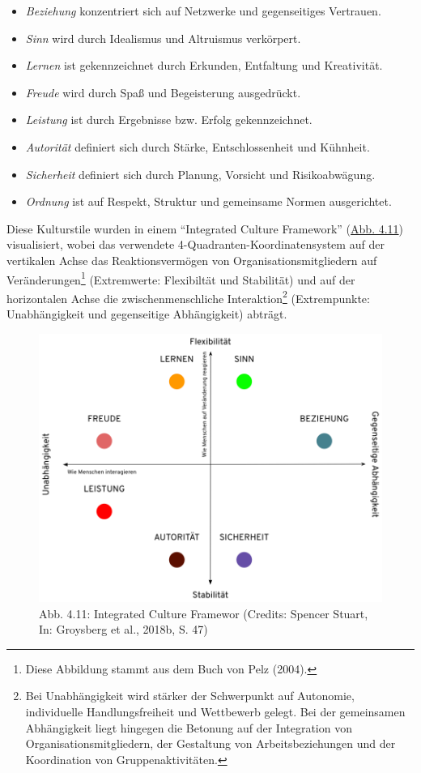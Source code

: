 \documentclass[
  letterpaper,
]{book}
\begin{document}
\begin{itemize}
\item
  \emph{Beziehung} konzentriert sich auf Netzwerke und gegenseitiges
  Vertrauen.
\item
  \emph{Sinn} wird durch Idealismus und Altruismus verkörpert.
\item
  \emph{Lernen} ist gekennzeichnet durch Erkunden, Entfaltung und
  Kreativität.
\item
  \emph{Freude} wird durch Spaß und Begeisterung ausgedrückt.
\item
  \emph{Leistung} ist durch Ergebnisse bzw. Erfolg gekennzeichnet.
\item
  \emph{Autorität} definiert sich durch Stärke, Entschlossenheit und
  Kühnheit.
\item
  \emph{Sicherheit} definiert sich durch Planung, Vorsicht und
  Risikoabwägung.
\item
  \emph{Ordnung} ist auf Respekt, Struktur und gemeinsame Normen
  ausgerichtet.
\end{itemize}

Diese Kulturstile wurden in einem ``Integrated Culture Framework''
(\hyperref[figure411]{Abb. 4.11}) visualisiert, wobei das verwendete
4-Quadranten-Koordinatensystem auf der vertikalen Achse das
Reaktionsvermögen von Organisationsmitgliedern auf
Veränderungen\footnote{Diese Abbildung stammt aus dem Buch von Pelz
  (2004).} (Extremwerte: Flexibiltät und Stabilität) und auf der
horizontalen Achse die zwischenmenschliche Interaktion\footnote{Bei
  Unabhängigkeit wird stärker der Schwerpunkt auf Autonomie,
  individuelle Handlungsfreiheit und Wettbewerb gelegt. Bei der
  gemeinsamen Abhängigkeit liegt hingegen die Betonung auf der
  Integration von Organisationsmitgliedern, der Gestaltung von
  Arbeitsbeziehungen und der Koordination von Gruppenaktivitäten.}
(Extrempunkte: Unabhängigkeit und gegenseitige Abhängigkeit) abträgt.

\begin{figure}

\includegraphics[width=0.8\linewidth,height=\textheight,keepaspectratio]{images/figure411.png} \hfill{}

\caption{Abb. 4.11: Integrated Culture Framewor (Credits: Spencer
Stuart, In: Groysberg et al., 2018b, S. 47)}

\end{figure}%
\end{document}
